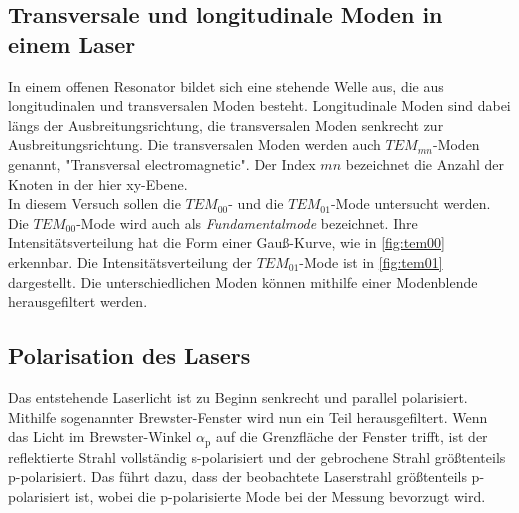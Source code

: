 \subsection{Transversale und longitudinale Moden in einem Laser}
\label{sec:moden}

    In einem offenen Resonator bildet sich eine stehende Welle aus,
    die aus longitudinalen und transversalen Moden besteht.
    Longitudinale Moden sind dabei längs der Ausbreitungsrichtung,
    die transversalen Moden senkrecht zur Ausbreitungsrichtung.
    Die transversalen Moden werden auch $TEM_{mn}$-Moden genannt,
    "Transversal electromagnetic".
    Der Index $mn$ bezeichnet die Anzahl der Knoten in der hier xy-Ebene.\\
    In diesem Versuch sollen die $TEM_{00}$- und die $TEM_{01}$-Mode untersucht werden.
    Die $TEM_{00}$-Mode wird auch als \textit{Fundamentalmode} bezeichnet.
    Ihre Intensitätsverteilung hat die Form einer Gauß-Kurve,
    wie in \autoref{fig:tem00} erkennbar.
    Die Intensitätsverteilung der $TEM_{01}$-Mode ist in \autoref{fig:tem01} dargestellt.
    Die unterschiedlichen Moden können mithilfe einer Modenblende herausgefiltert werden.

\subsection{Polarisation des Lasers}

    Das entstehende Laserlicht ist zu Beginn senkrecht und parallel polarisiert.
    Mithilfe sogenannter Brewster-Fenster wird nun ein Teil herausgefiltert.
    Wenn das Licht im Brewster-Winkel $\alpha_\text{p}$ auf die Grenzfläche der Fenster trifft,
    ist der reflektierte Strahl vollständig s-polarisiert und der gebrochene Strahl größtenteils p-polarisiert.
    Das führt dazu,
    dass der beobachtete Laserstrahl größtenteils p-polarisiert ist,
    wobei die p-polarisierte Mode bei der Messung bevorzugt wird.